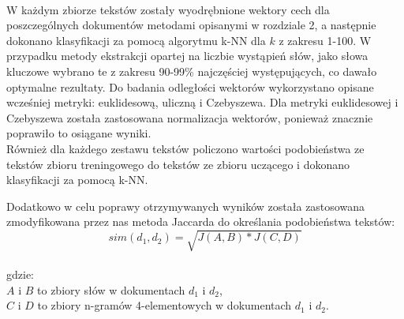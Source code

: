 \documentclass{classrep}
\begin{document}
{\paragraph{}
W każdym zbiorze tekstów zostały wyodrębnione wektory cech dla poszczególnych dokumentów metodami opisanymi w rozdziale 2, a następnie dokonano klasyfikacji za pomocą algorytmu k-NN dla $k$ z zakresu 1-100. W przypadku metody ekstrakcji opartej na liczbie wystąpień słów, jako słowa kluczowe wybrano te z zakresu 90-99\% najczęściej występujących, co dawało optymalne rezultaty.
Do badania odległości wektorów wykorzystano opisane wcześniej metryki: euklidesową, uliczną i Czebyszewa. Dla metryki euklidesowej i Czebyszewa została zastosowana normalizacja wektorów, ponieważ znacznie poprawiło to osiągane wyniki.\\
Również dla każdego zestawu tekstów policzono wartości podobieństwa ze tekstów zbioru treningowego do tekstów ze zbioru uczącego i dokonano klasyfikacji za pomocą k-NN.

Dodatkowo w celu poprawy otrzymywanych wyników została zastosowana zmodyfikowana przez nas metoda Jaccarda do określania podobieństwa tekstów: $$sim(d_1, d_2) = \sqrt{J(A ,B)*J(C, D)}$$\\
gdzie:\\
$A$ i $B$ to zbiory słów w dokumentach $d_1$ i $d_2$,\\
$C$ i $D$ to zbiory n-gramów 4-elementowych w dokumentach $d_1$ i $d_2$.
}
\end{document}

